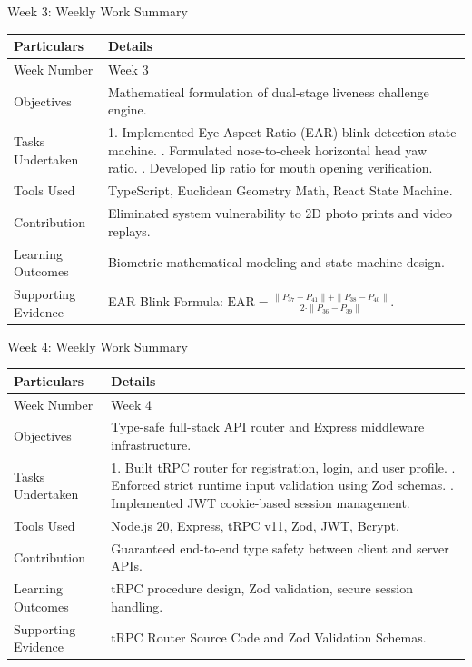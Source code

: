 \documentclass[aspectratio=169, 11pt]{beamer}
\begin{document}
\begin{frame}{Week 3: Weekly Work Summary}
\small
\renewcommand{\arraystretch}{1.2}
\begin{tabular}{|p{3.2cm}|p{8.0cm}|}
\hline
\rowcolor{gray!15} \textbf{Particulars} & \textbf{Details} \\ \hline
Week Number & Week 3 \\ \hline
Objectives & Mathematical formulation of dual-stage liveness challenge engine. \\ \hline
Tasks Undertaken & 1. Implemented Eye Aspect Ratio (EAR) blink detection state machine. \newline 2. Formulated nose-to-cheek horizontal head yaw ratio. \newline 3. Developed lip ratio for mouth opening verification. \\ \hline
Tools Used & TypeScript, Euclidean Geometry Math, React State Machine. \\ \hline
Contribution & Eliminated system vulnerability to 2D photo prints and video replays. \\ \hline
Learning Outcomes & Biometric mathematical modeling and state-machine design. \\ \hline
Supporting Evidence & EAR Blink Formula: $\text{EAR} = \frac{\|P_{37}-P_{41}\| + \|P_{38}-P_{40}\|}{2 \cdot \|P_{36}-P_{39}\|}$. \\ \hline
\end{tabular}
\end{frame}

\begin{frame}{Week 4: Weekly Work Summary}
\small
\renewcommand{\arraystretch}{1.2}
\begin{tabular}{|p{3.2cm}|p{8.0cm}|}
\hline
\rowcolor{gray!15} \textbf{Particulars} & \textbf{Details} \\ \hline
Week Number & Week 4 \\ \hline
Objectives & Type-safe full-stack API router and Express middleware infrastructure. \\ \hline
Tasks Undertaken & 1. Built tRPC router for registration, login, and user profile. \newline 2. Enforced strict runtime input validation using Zod schemas. \newline 3. Implemented JWT cookie-based session management. \\ \hline
Tools Used & Node.js 20, Express, tRPC v11, Zod, JWT, Bcrypt. \\ \hline
Contribution & Guaranteed end-to-end type safety between client and server APIs. \\ \hline
Learning Outcomes & tRPC procedure design, Zod validation, secure session handling. \\ \hline
Supporting Evidence & tRPC Router Source Code and Zod Validation Schemas. \\ \hline
\end{tabular}
\end{frame}
\end{document}
